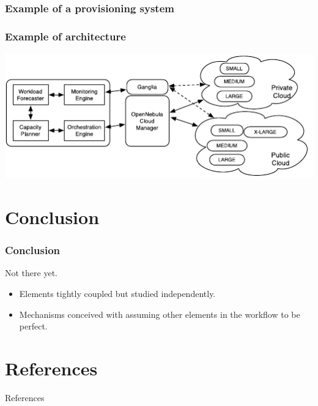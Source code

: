 \documentclass{beamer}
\begin{document}
\begin{frame}
  \frametitle{Example of a provisioning system~\cite{sharma2011cost}}
\end{frame}

\begin{frame}
  \frametitle{Example of architecture~\cite{sharma2011cost}}
  \includegraphics[width=\textwidth]{images/elasticity4_arch.pdf}
\end{frame}


\section*{Conclusion}
\begin{frame}
  \frametitle{Conclusion}
  Not there yet.
  \begin{itemize}
    \item Elements tightly coupled but studied independently.
    \item Mechanisms conceived with assuming other elements in the workflow to be perfect.
  \end{itemize}
\end{frame}


\appendix
\section*{References}
\begin{frame}[allowframebreaks]{References}
  
  
\end{frame}
\end{document}
